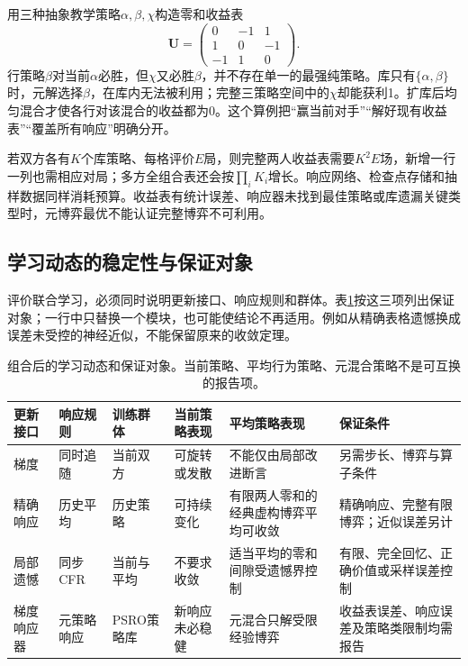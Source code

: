 用三种抽象教学策略$\alpha,\beta,\chi$构造零和收益表
\[
 \bm U=
 \begin{pmatrix}0&-1&1\\1&0&-1\\-1&1&0\end{pmatrix}.
\]
行策略$\beta$对当前$\alpha$必胜，但$\chi$又必胜$\beta$，并不存在单一的最强纯策略。库只有$\{\alpha,\beta\}$时，元解选择$\beta$，在库内无法被利用；完整三策略空间中的$\chi$却能获利1。扩库后均匀混合才使各行对该混合的收益都为0。这个算例把“赢当前对手”“解好现有收益表”“覆盖所有响应”明确分开。

若双方各有$K$个库策略、每格评价$E$局，则完整两人收益表需要$K^2E$场，新增一行一列也需相应对局；多方全组合表还会按$\prod_iK_i$增长。响应网络、检查点存储和抽样数据同样消耗预算。收益表有统计误差、响应器未找到最佳策略或库遗漏关键类型时，元博弈最优不能认证完整博弈不可利用。

\subsection{学习动态的稳定性与保证对象}
\label{sec:rl-multi-agent-stability}

评价联合学习，必须同时说明更新接口、响应规则和群体。表\ref{tab:rl-multi-agent-dynamics}按这三项列出保证对象；一行中只替换一个模块，也可能使结论不再适用。例如从精确表格遗憾换成误差未受控的神经近似，不能保留原来的收敛定理。

\begin{table}[htbp]
 \centering
 \begin{tabularx}{\linewidth}{@{}l l l >{\raggedright\arraybackslash}X >{\raggedright\arraybackslash}X >{\raggedright\arraybackslash}X@{}}
 \toprule
 更新接口 & 响应规则 & 训练群体 & 当前策略表现 & 平均策略表现 & 保证条件\\
 \midrule
 梯度 & 同时追随 & 当前双方 & 可旋转或发散 & 不能仅由局部改进断言 & 另需步长、博弈与算子条件\\
 精确响应 & 历史平均 & 历史策略 & 可持续变化 & 有限两人零和的经典虚构博弈平均可收敛 & 精确响应、完整有限博弈；近似误差另计\\
 局部遗憾 & 同步CFR & 当前与平均 & 不要求收敛 & 适当平均的零和间隙受遗憾界控制 & 有限、完全回忆、正确价值或采样误差控制\\
 梯度响应器 & 元策略响应 & PSRO策略库 & 新响应未必稳健 & 元混合只解受限经验博弈 & 收益表误差、响应误差及策略类限制均需报告\\
 \bottomrule
 \end{tabularx}
 \caption{组合后的学习动态和保证对象。当前策略、平均行为策略、元混合策略不是可互换的报告项。}
 \label{tab:rl-multi-agent-dynamics}
\end{table}

